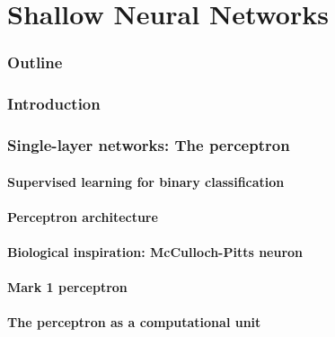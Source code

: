 \renewcommand{\prevpart}{1 }
\renewcommand{\thispart}{2 }
\renewcommand{\nextpart}{3 }
\renewcommand{\thispartname}{Shallow Neural Networks}

\part{\thispartname}



\section{Outline}


\section{Introduction}



\section{Single-layer networks: The perceptron}
\subsection{Supervised learning for binary classification}

\subsection{Perceptron architecture}

\subsection{Biological inspiration: McCulloch-Pitts neuron}

\subsection{Mark 1 perceptron}

\subsection{The perceptron as a computational unit}


